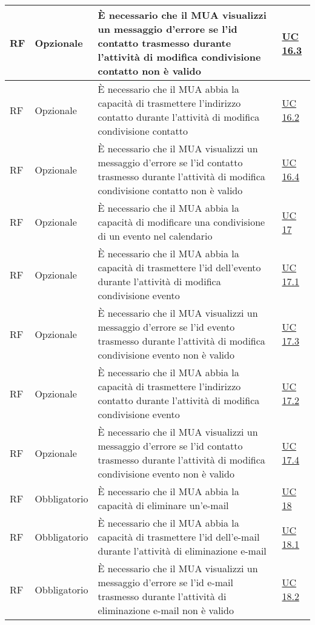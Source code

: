 \begin{longtable}{*{1}{>{\centering\arraybackslash}p{1.5cm}}*{1}{>{\centering\arraybackslash}p{2.5cm}}p{6cm}*{1}{>{\centering\arraybackslash}p{3cm}}}
    \\\hline
    RF & Opzionale & È necessario che il MUA visualizzi un messaggio d'errore se l'id contatto trasmesso durante l'attività di modifica condivisione contatto non è valido & \hyperref[sec:UC16.3]{UC 16.3}
    \\\hline
    RF & Opzionale & È necessario che il MUA abbia la capacità di trasmettere l'indirizzo contatto durante l'attività di modifica condivisione contatto & \hyperref[sec:UC16.2]{UC 16.2}
    \\\hline
    RF & Opzionale & È necessario che il MUA visualizzi un messaggio d'errore se l'id contatto trasmesso durante l'attività di modifica condivisione contatto non è valido & \hyperref[sec:UC16.4]{UC 16.4}
    \\\hline
    RF & Opzionale & È necessario che il MUA abbia la capacità di modificare una condivisione di un evento nel calendario & \hyperref[sec:UC17]{UC 17}
    \\\hline
    RF & Opzionale & È necessario che il MUA abbia la capacità di trasmettere l'id dell'evento durante l'attività di modifica condivisione evento & \hyperref[sec:UC17.1]{UC 17.1}
    \\\hline
    RF & Opzionale & È necessario che il MUA visualizzi un messaggio d'errore se l'id evento trasmesso durante l'attività di modifica condivisione evento non è valido & \hyperref[sec:UC17.3]{UC 17.3}
    \\\hline
    RF & Opzionale & È necessario che il MUA abbia la capacità di trasmettere l'indirizzo contatto durante l'attività di modifica condivisione evento & \hyperref[sec:UC17.2]{UC 17.2}
    \\\hline
    RF & Opzionale & È necessario che il MUA visualizzi un messaggio d'errore se l'id contatto trasmesso durante l'attività di modifica condivisione evento non è valido & \hyperref[sec:UC17.4]{UC 17.4}
    \\\hline
    RF & Obbligatorio & È necessario che il MUA abbia la capacità di eliminare un'e-mail & \hyperref[sec:UC18]{UC 18}
    \\\hline
    RF & Obbligatorio & È necessario che il MUA abbia la capacità di trasmettere l'id dell'e-mail durante l'attività di eliminazione e-mail & \hyperref[sec:UC18.1]{UC 18.1}
    \\\hline
    RF & Obbligatorio & È necessario che il MUA visualizzi un messaggio d'errore se l'id e-mail trasmesso durante l'attività di eliminazione e-mail non è valido & \hyperref[sec:UC18.2]{UC 18.2}
    \\\hline

\end{longtable}
